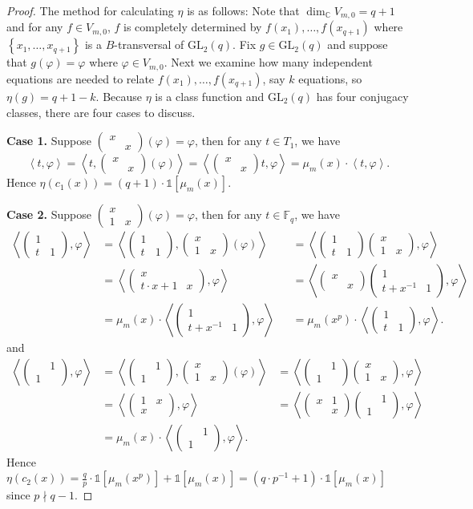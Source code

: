 \documentclass[12pt, reqno]{amsart}
\theoremstyle{definition}
\theoremstyle{remark}
\numberwithin{equation}{section}
\newcommand{\BC}{\mathbb{C}}
\newcommand{\BF}{\mathbb{F}}
\newcommand{\pt}[1]{\left(#1\right)}
\newcommand{\cb}[1]{\left\{#1\right\}}
\newcommand{\jk}[1]{\left\langle#1\right\rangle}
\newcommand{\fk}[1]{\left[#1\right]}
\newcommand{\GL}{\mathrm{GL}}
\newcommand{\jz}[4]{{\begin{pmatrix}
		#1&#2\\
		#3&#4
\end{pmatrix}}}
\newcommand{\one}{\mathds{1}}
\begin{document}
\begin{proof}
	
	The method for calculating $\eta$ is as follows: Note that $\dim_{\BC}V_{m, 0} = q + 1$ and for any $f \in V_{m, 0}$, $f$ is completely determined by $f(x_1), \ldots, f(x_{q + 1})$ where $\cb{x_1, \ldots, x_{q + 1}}$ is a $B$-transversal of $\GL_2(q)$. Fix $g \in \GL_2(q)$ and suppose that $g(\varphi) = \varphi$ where $\varphi \in V_{m, 0}$. Next we examine how many independent equations are needed to relate $f(x_1), \ldots, f(x_{q + 1})$, say $k$ equations, so $\eta(g) = q + 1 - k$. Because $\eta$ is a class function and $\GL_2(q)$ has four conjugacy classes, there are four cases to discuss. 
	
	\textbf{Case 1.} Suppose $\jz{x}{}{}{x}(\varphi) = \varphi$, then for any $t \in T_1$, we have
	\[\jk{t, \varphi}
	= \jk{t, \jz{x}{}{}{x}(\varphi)}
	= \jk{\jz{x}{}{}{x}t, \varphi}
	= \mu_{m}(x)\cdot\jk{t, \varphi}.\]
	Hence $\eta\pt{c_1(x)} = (q + 1)\cdot\one\fk{{\mu_{m}(x)}}$.
	
	\textbf{Case 2.} Suppose $\jz{x}{}{1}{x}(\varphi) = \varphi$, then for any $t \in \BF_q$, we have
	\[\begin{aligned}
		\jk{\jz{1}{}{t}{1}, \varphi}
		&= \jk{\jz{1}{}{t}{1}, \jz{x}{}{1}{x}(\varphi)}
		&&= \jk{\jz{1}{}{t}{1}\jz{x}{}{1}{x}, \varphi} \\
		&= \jk{\jz{x}{}{t\cdot x + 1}{x}, \varphi}
		&&= \jk{\jz{x}{}{}{x}\jz{1}{}{t + x^{-1}}{1}, \varphi} \\
		&= \mu_{m}(x)\cdot\jk{\jz{1}{}{t + x^{-1}}{1}, \varphi}
		&&= \mu_{m}(x^p)\cdot\jk{\jz{1}{}{t}{1}, \varphi}.
	\end{aligned}\]
	and
	\[\begin{aligned}
		\jk{\jz{}{1}{1}{}, \varphi} 
		&= \jk{\jz{}{1}{1}{}, \jz{x}{}{1}{x}(\varphi)}
		&= \jk{\jz{}{1}{1}{}\jz{x}{}{1}{x}, \varphi} \\
		&= \jk{\jz{1}{x}{x}{}, \varphi}
		&= \jk{\jz{x}{1}{}{x}\jz{}{1}{1}{}, \varphi} \\
		&= \mu_{m}(x) \cdot \jk{\jz{}{1}{1}{}, \varphi}.
	\end{aligned}\]
	Hence $\eta\pt{c_2(x)} = \frac{q}{p}\cdot\one\fk{{\mu_{m}(x^p)}} + \one\fk{{\mu_{m}(x)}} = \pt{q\cdot p^{-1} + 1}\cdot\one\fk{\mu_m(x)}$ since $p \nmid q - 1$.
	

\end{proof}
\end{document}
